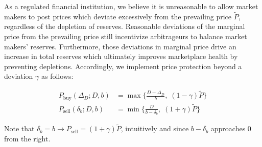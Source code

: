 \documentclass{article}
\begin{document}
As a regulated financial institution, we believe it is unreasonable to allow market makers to post prices which deviate excessively from the prevailing price $\tilde{P}$, regardless of the depletion of reserves. Reasonable deviations of the marginal price from the prevailing price still incentivize arbitrageurs to balance market makers' reserves. Furthermore, those deviations in marginal price drive an increase in total reserves which ultimately improves marketplace health by preventing depletions. Accordingly, we implement price protection beyond a deviation $\gamma$ as follows:

\begin{equation}
\begin{split}
P_{\mathrm{buy}}(\Delta_D; D, b) &= \max \big\{ \frac{D - \Delta_D}{b}, \; (1 - \gamma)\tilde{P} \big\} \\
P_{\mathrm{sell}}(\delta_b; D, b) &= \min \big\{ \frac{D}{b - \delta_b}, \; (1 + \gamma)\tilde{P} \big\}
\end{split}
\end{equation}

Note that $\delta_b = b \rightarrow P_{\mathrm{sell}} = (1 + \gamma) \tilde{P}$, intuitively and since $b - \delta_b$ approaches $0$ from the right.

  
\end{document}

